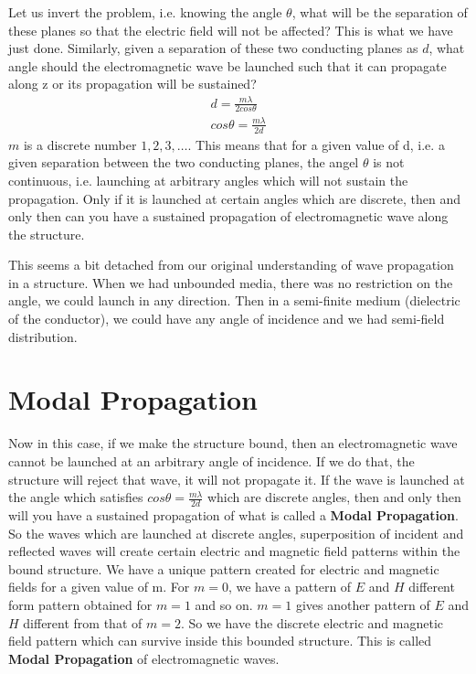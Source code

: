 Let us invert the problem, i.e. knowing the angle $\theta$, what will be the separation of these planes so that the electric field will not be affected? This is what we have just done. Similarly, given a separation of these two conducting planes as $d$, what angle should the electromagnetic wave be launched such that it can propagate along z or its propagation will be sustained? 
\begin{align*}
d = \frac{m\lambda}{2cos\theta}\\
cos\theta = \frac{m\lambda}{2d}
\end{align*}
$m$ is a discrete number $1, 2, 3, \ldots$. This means that for a given value of d, i.e. a given separation between the two conducting planes, the angel $\theta$ is not continuous, i.e. launching at arbitrary angles which will not sustain the propagation. Only if it is launched at certain angles which are discrete, then and only then can you have a sustained propagation of electromagnetic wave along the structure.

This seems a bit detached from our original understanding of wave propagation in a structure. When we had unbounded media, there was no restriction on the angle, we could launch in any direction. Then in a semi-finite medium (dielectric of the conductor), we could have any angle of incidence and we had semi-field distribution.

\section{Modal Propagation}
Now in this case, if we make the structure bound, then an electromagnetic wave cannot be launched at an arbitrary angle of incidence. If we do that, the structure will reject that wave, it will not propagate it. If the wave is launched at the angle which satisfies $cos\theta = \frac{m\lambda}{2d}$ which are discrete angles, then and only then will you have a sustained propagation of what is called a \textbf{Modal Propagation}. So the waves which are launched at discrete angles, superposition of incident and reflected waves will create certain electric and magnetic field patterns within the bound structure. We have a unique pattern created for electric and magnetic fields for a given value of m. For $m=0$, we have a pattern of $E$ and $H$ different form pattern obtained for $m=1$ and so on. $m=1$ gives another pattern of $E$ and $H$ different from that of $m=2$. So we have the discrete electric and magnetic field pattern which can survive inside this bounded structure. This is called \textbf{Modal Propagation} of electromagnetic waves.

